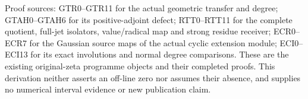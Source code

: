 Proof sources: GTR0--GTR11 for the actual geometric transfer and degree;
GTAH0--GTAH6 for its positive-adjoint defect; RTT0--RTT11 for the
complete quotient, full-jet isolators, value/radical map and strong
residue receiver; ECR0--ECR7 for the Gaussian source maps of the actual
cyclic extension module; ECI0--ECI13 for its exact involutions and
normal degree comparisons. These are the existing original-zeta
programme objects and their completed proofs. This derivation neither
asserts an off-line zero nor assumes their absence, and supplies no
numerical interval evidence or new publication claim.
